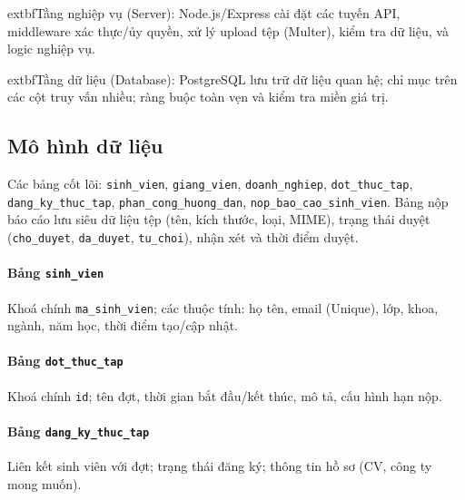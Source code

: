 \documentclass[conference]{IEEEtran}
\begin{document}
	extbf{Tầng nghiệp vụ (Server)}: Node.js/Express cài đặt các tuyến API, middleware xác thực/ủy quyền, xử lý upload tệp (Multer), kiểm tra dữ liệu, và logic nghiệp vụ.

	extbf{Tầng dữ liệu (Database)}: PostgreSQL lưu trữ dữ liệu quan hệ; chỉ mục trên các cột truy vấn nhiều; ràng buộc toàn vẹn và kiểm tra miền giá trị.


\subsection{Mô hình dữ liệu}
Các bảng cốt lõi: \texttt{sinh\_vien}, \texttt{giang\_vien}, \texttt{doanh\_nghiep}, \texttt{dot\_thuc\_tap}, \texttt{dang\_ky\_thuc\_tap}, \texttt{phan\_cong\_huong\_dan}, \texttt{nop\_bao\_cao\_sinh\_vien}. Bảng nộp báo cáo lưu siêu dữ liệu tệp (tên, kích thước, loại, MIME), trạng thái duyệt (\texttt{cho\_duyet}, \texttt{da\_duyet}, \texttt{tu\_choi}), nhận xét và thời điểm duyệt.


\paragraph{Bảng \texttt{sinh\_vien}} Khoá chính \texttt{ma\_sinh\_vien}; các thuộc tính: họ tên, email (Unique), lớp, khoa, ngành, năm học, thời điểm tạo/cập nhật.

\paragraph{Bảng \texttt{dot\_thuc\_tap}} Khoá chính \texttt{id}; tên đợt, thời gian bắt đầu/kết thúc, mô tả, cấu hình hạn nộp.

\paragraph{Bảng \texttt{dang\_ky\_thuc\_tap}} Liên kết sinh viên với đợt; trạng thái đăng ký; thông tin hồ sơ (CV, công ty mong muốn).
\end{document}
